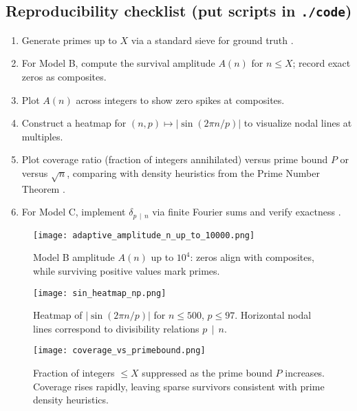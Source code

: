 \documentclass[12pt]{article}
\theoremstyle{definition}
\theoremstyle{remark}
\newcommand{\divides}{\,\mid\,}
\begin{document}
\subsection*{Reproducibility checklist (put scripts in \texttt{./code})}
\begin{enumerate}
  \item Generate primes up to $X$ via a standard sieve for ground truth 
  \citep{crandall2006prime}.  
  \item For Model B, compute the survival amplitude $A(n)$ for $n\le X$; record exact zeros as composites.  
  \item Plot $A(n)$ across integers to show zero spikes at composites.  
  \item Construct a heatmap for $(n,p) \mapsto |\sin(2\pi n/p)|$ to visualize nodal lines at multiples.  
  \item Plot coverage ratio (fraction of integers annihilated) versus prime bound $P$ or versus $\sqrt{n}$, 
  comparing with density heuristics from the Prime Number Theorem 
  \citep{hardy2008introduction,tenenbaum2015analytic}.  
  \item For Model C, implement $\delta_{p\divides n}$ via finite Fourier sums and verify exactness 
  \citep{montgomery2006multiplicative}.  
\end{enumerate}

\begin{figure}[h]
  \centering
  \texttt{[image: adaptive\_amplitude\_n\_up\_to\_10000.png]}
  \caption{Model B amplitude $A(n)$ up to $10^4$: zeros align with composites, while surviving positive values mark primes.}
  \label{fig:amplitude}
\end{figure}

\begin{figure}[h]
  \centering
  \texttt{[image: sin\_heatmap\_np.png]}
  \caption{Heatmap of $|\sin(2\pi n/p)|$ for $n\le 500$, $p\le 97$. Horizontal nodal lines correspond to divisibility relations $p\divides n$.}
  \label{fig:heatmap}
\end{figure}

\begin{figure}[h]
  \centering
  \texttt{[image: coverage\_vs\_primebound.png]}
  \caption{Fraction of integers $\le X$ suppressed as the prime bound $P$ increases. Coverage rises rapidly, leaving sparse survivors consistent with prime density heuristics.}
  \label{fig:coverage}
\end{figure}
\end{document}
